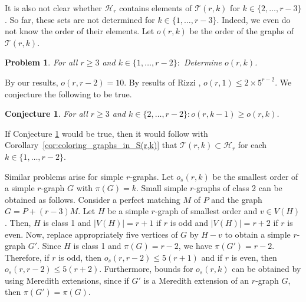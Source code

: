 \documentclass[a4paper,11pt]{article}
\newcommand{\ca}{\mathcal}
\newtheorem{con}[defi]{Conjecture}
\newtheorem{prob}[defi]{Problem}
\theoremstyle{remark}
\begin{document}
It is also not clear whether $\ca H_r$ contains elements
of $\ca T(r,k)$ for $k \in \{2, \dots, r-3\}$. 
So far, these sets are not determined for $k \in \{1, \dots, r-3\}$. 
Indeed, we even do not know the order of their elements. 
Let 
$o(r,k)$ be the order of the graphs of $\ca T(r,k)$. 

\begin{prob}\label{o(r,k)}
	For all $r \geq 3$ and $k \in \{1, \dots, r-2 \}\colon$ Determine $o(r,k)$.  
\end{prob}

By our results, $o(r,r-2) = 10$.
By results of Rizzi \cite{rizzi1999indecomposable}, $o(r,1) \leq 2 \times 5^{r-2}$. We conjecture the following to be true.

\begin{con} \label{conj: order}
	For all $r \geq 3$ and $k \in \{2, \dots, r-2\} \colon o(r,k-1) \geq o(r,k)$.
\end{con} 

If Conjecture \ref{conj: order} would be true, then it would follow
with Corollary~\ref{cor:coloring_graphs_in_S(r,k)} that $\ca T(r,k) \subset \ca H_r$ 
for each $k \in \{1, \dots, r-2\}$. 

Similar problems arise for simple $r$-graphs. Let $o_s(r,k)$ be the smallest
order of a simple $r$-graph $G$ with $\pi(G)=k$.
Small simple $r$-graphs of class 2 can be obtained as follows. Consider a perfect matching $M$ of $P$ and the graph $G=P+(r-3)M$. Let $H$ be a simple $r$-graph of smallest order and $v \in V(H)$. Then, $H$ is class 1 and $|V(H)|=r+1$ if $r$ is odd and $|V(H)|=r+2$ if $r$ is even. Now, replace appropriately five vertices of $G$ by $H-v$ to obtain a simple $r$-graph $G'$. Since $H$ is class 1 and $\pi(G)=r-2$, we have $\pi (G')=r-2$.   Therefore, if $r$ is odd, then $o_s(r,r-2) \leq 5(r+1)$ and
if $r$ is even, then $o_s(r,r-2) \leq 5(r+2)$. Furthermore, bounds for $o_s(r,k)$ can be obtained by using Meredith extensions, since if $G'$ is a Meredith extension of an $r$-graph $G$, then $\pi(G')=\pi(G)$.








	


{}

\end{document}
